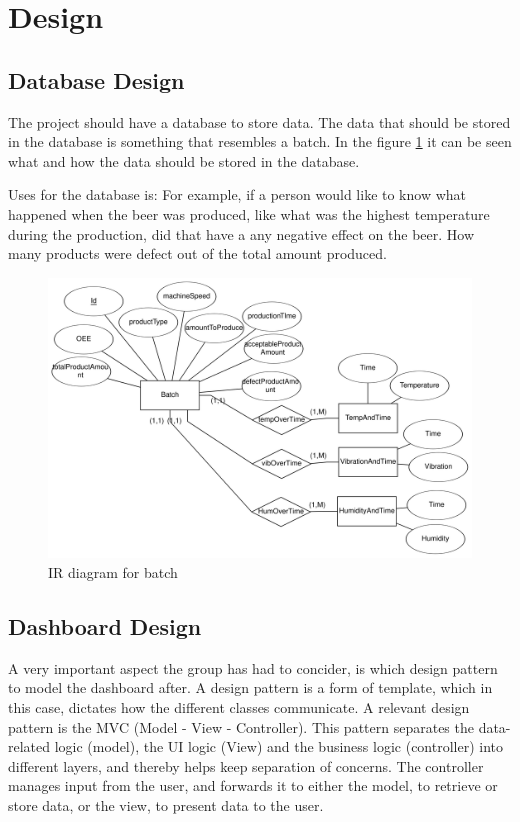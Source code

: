 \section{Design}

\subsection{Database Design}
The project should have a database to store data. 
The data that should be stored in the database is something that 
resembles a batch. In the figure \ref{figure:eer_diagram_batch} it can be seen
what and how the data should be stored in the database.

Uses for the database is:
For example, if a person would like to 
know what happened when the beer was produced,
like what was the highest temperature during the production, did that have a
any negative effect on the beer.
How many products were defect out of the total amount produced. 

\begin{figure}[ht]
\centering 
\includegraphics[width=0.8\linewidth]{images/eer_diagrams/database_EER_batch.png}
\caption{IR diagram for batch} 
\label{figure:eer_diagram_batch}
\end{figure}

\subsection{Dashboard Design}
A very important aspect the group has had to concider, is which design pattern
to model the dashboard after. A design pattern is a form of template, which in
this case, dictates how the different classes communicate. A relevant design
pattern is the MVC (Model - View - Controller). This pattern separates the
data-related logic (model), the UI logic (View) and the business logic 
(controller) into different layers, and thereby helps keep separation of
concerns. The controller manages input from the user, and forwards it to either
the model, to retrieve or store data, or the view, to present data to the user.

